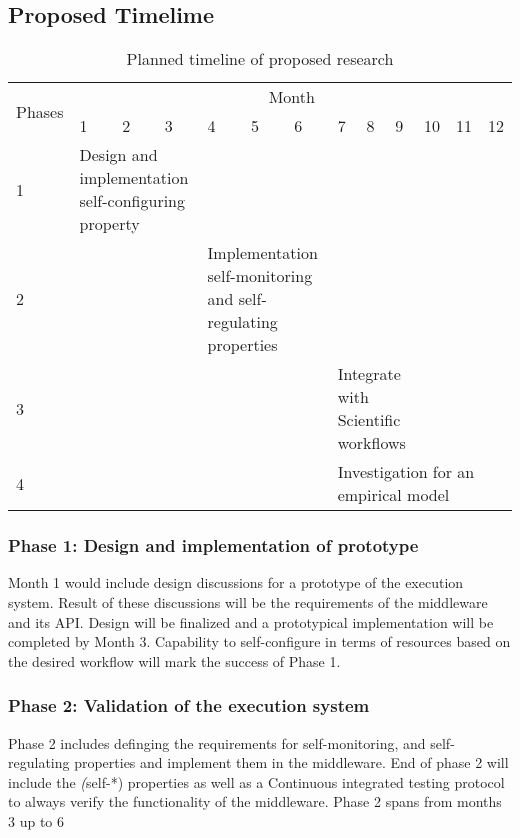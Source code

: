 \subsection{Proposed Timelime}
\begin{table*}[ht]
	\centering
	\begin{tabular}{|p{1.1cm}|p{0.75cm}p{0.75cm}p{0.75cm}p{0.75cm}p{0.75cm}p{0.75cm}p{0.75cm}p{0.75cm}p{0.75cm}p{0.75cm}p{0.75cm}p{0.75cm}|}
		\hline
		\multirow{2}{*}{Phases} & \multicolumn{12}{|c|}{Month}\\
		   & 1 & 2 & 3 & 4 & 5 & 6 & 7 & 8 & 9 & 10 & 11 & 12\\\hline\hline
		 1 & \multicolumn{3}{p{2.25cm}}{Design and implementation self-configuring property}&   &   &   &   &   &   &    &    &   \\\hline
		 2 &   &   &   & \multicolumn{3}{p{2.25cm}}{Implementation self-monitoring and self-regulating properties} &   &   &   &    &    &   \\\hline
		 3 &   &   &   &   &   &   &\multicolumn{3}{p{2.25cm}}{Integrate with Scientific workflows}&    &    &   \\\hline
		 4 &   &   &   &   &   &   &\multicolumn{6}{p{4.5cm}|}{Investigation for an empirical model} \\\hline
	\end{tabular}
\caption{Planned timeline of proposed research}\label{tab:work_plan}
\end{table*}

\subsubsection{Phase 1: Design and implementation of prototype}

Month 1 would include design discussions for a prototype of the execution system. Result of these discussions will be the requirements of the middleware and its API. Design will be finalized and a prototypical implementation will be completed by Month 3. Capability to self-configure in terms of resources based on the desired workflow will mark the success of Phase 1.

\subsubsection{Phase 2: Validation of the execution system}
Phase 2 includes definging the requirements for self-monitoring, and self-regulating properties and implement them in the middleware. End of phase 2 will include the \textit(self-*) properties as well as a Continuous integrated testing protocol to always verify the functionality of the middleware. Phase 2 spans from months 3 up to 6

